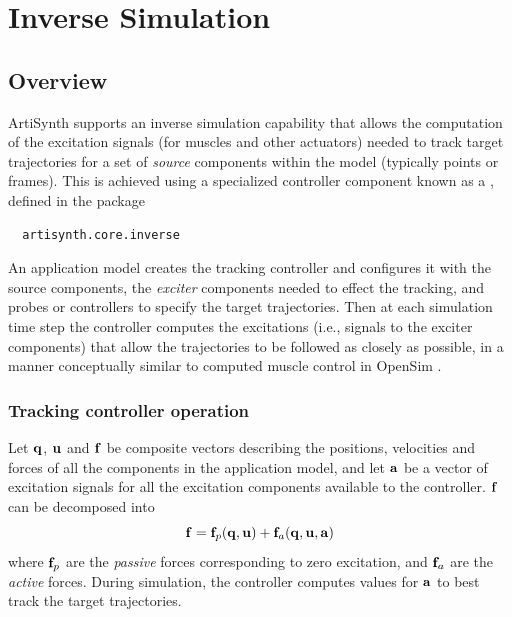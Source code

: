 \ifdefined\maindoc\else
\def\doctitle{Inverse Simulation}

\mainmatter
\fi

\chapter{Inverse Simulation}
\label{InverseSimulation:sec}

\section{Overview}

ArtiSynth supports an inverse simulation capability that allows the computation
of the excitation signals (for muscles and other actuators) needed to track
target trajectories for a set of {\it source} components within the model
(typically points or frames). This is achieved using a specialized controller
component known as a
, defined in the package
%
\begin{verbatim}
  artisynth.core.inverse
\end{verbatim}
%
An application model creates the tracking controller and configures it with the
source components, the {\it exciter} components needed to effect the tracking,
and probes or controllers to specify the target trajectories. Then at each
simulation time step the controller computes the excitations (i.e., signals to
the exciter components) that allow the trajectories to be followed as closely
as possible, in a manner conceptually similar to computed muscle control in
OpenSim \cite{delp2007opensim}.

\subsection{Tracking controller operation}

Let ${\bf q}$, ${\bf u}$ and ${\bf f}$ be composite vectors describing the positions,
velocities and forces of all the components in the application model,
and let ${\bf a}$ be a vector of excitation signals for all the excitation
components available to the controller. ${\bf f}$ can be decomposed into
%
\begin{equation}
{\bf f} = {\bf f}_p ({\bf q}, {\bf u}) + {\bf f}_a ({\bf q}, {\bf u}, {\bf a})
\label{fnonlinear:eqn}	
\end{equation}
%
where ${\bf f}_p$ are the {\it passive} forces corresponding to zero excitation, and
${\bf f}_a$ are the {\it active} forces. During simulation, the controller computes
values for ${\bf a}$ to best track the target trajectories.

